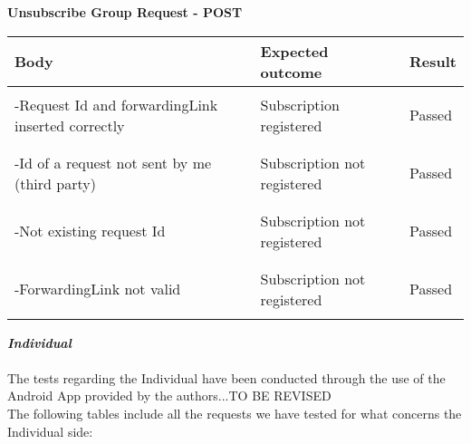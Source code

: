 \textbf{Unsubscribe Group Request - POST}
\begin{center}
	\begin{tabular}{|p{}|p{}|p{}|}
		\hline
		Body & Expected outcome & Result \\
		\hline
		&&\\
		-Request Id and forwardingLink inserted correctly&Subscription registered&Passed\\
		&&\\
		\hline
		&&\\
		-Id of a request not sent by me (third party)&Subscription not registered&Passed\\
		&&\\
		\hline
		&&\\
		-Not existing request Id &Subscription not registered&Passed\\
		&&\\
		\hline
		&&\\
		-ForwardingLink not valid &Subscription not registered&Passed\\
		&&\\
		\hline
	\end{tabular}
\end{center}
\textbf{\textit{Individual}}\\\\
The tests regarding the Individual have been conducted through the use of the Android App provided by the authors...TO BE REVISED\\ The following tables include all the requests we have tested for what concerns the Individual side:\\\\
